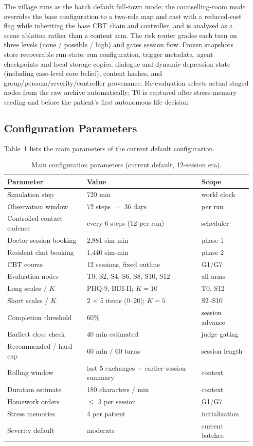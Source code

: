 \documentclass[10pt]{article}
\begin{document}
The village runs as the batch default full-town mode; the counselling-room mode overrides the base configuration to a two-role map and cast with a reduced-cost flag while inheriting the base CBT chain and controller, and is analysed as a scene ablation rather than a content arm.
The risk router grades each turn on three levels (none / possible / high) and gates session flow.
Frozen snapshots store recoverable run state: run configuration, trigger metadata, agent checkpoints and local storage copies, dialogue and dynamic depression state (including case-level core belief), content hashes, and group/persona/severity/controller provenance.
Re-evaluation selects actual staged nodes from the raw archive automatically; T0 is captured after stress-memory seeding and before the patient's first autonomous life decision.

\subsection{Configuration Parameters}

Table~\ref{tab:config} lists the main parameters of the current default configuration.

\begin{table}[h]
\centering
\caption{Main configuration parameters (current default, 12-session era).}
\label{tab:config}
\small
\begin{tabular}{@{}lll@{}}
\toprule
Parameter & Value & Scope \\
\midrule
Simulation step & 720 min & world clock \\
Observation window & 72 steps $=$ 36 days & per run \\
Controlled contact cadence & every 6 steps (12 per run) & scheduler \\
Doctor session booking & 2{,}881 sim-min & phase 1 \\
Resident chat booking & 1{,}440 sim-min & phase 2 \\
CBT course & 12 sessions, fixed outline & G1/G7 \\
Evaluation nodes & T0, S2, S4, S6, S8, S10, S12 & all arms \\
Long scales / $K$ & PHQ-9, BDI-II; $K=10$ & T0, S12 \\
Short scales / $K$ & 2 $\times$ 5 items (0--20); $K=5$ & S2--S10 \\
Completion threshold & 60\% & session advance \\
Earliest close check & 40 min estimated & judge gating \\
Recommended / hard cap & 60 min / 60 turns & session length \\
Rolling window & last 5 exchanges $+$ earlier-session summary & context \\
Duration estimate & 180 characters / min & context \\
Homework orders & $\le$ 3 per session & G1/G7 \\
Stress memories & 4 per patient & initialization \\
Severity default & moderate & current batches \\
\bottomrule
\end{tabular}
\end{table}
\end{document}
